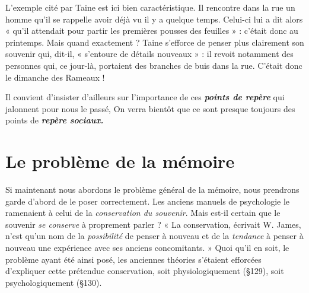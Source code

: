 \vspace{0.24cm}
{\footnotesize 
L’exemple cité par Taine est ici bien caractéristique. Il rencontre dans
la rue un homme qu’il se rappelle avoir déjà vu il y a quelque temps.
Celui-ci lui a dit alors « qu’il attendait pour partir les premières pousses
des feuilles » : c'était donc au printemps. Mais quand exactement ? Taine
s'efforce de penser plus clairement son souvenir qui, dit-il, « s’entoure de
détails nouveaux » : il revoit notamment des personnes qui, ce jour-là,
portaient des branches de buis dans la rue. C'était donc le dimanche des
Rameaux !}
\vspace{0.31cm}

Il convient d’insister d’ailleurs sur l'importance de ces \textbf{\textit {points de
repère}} qui jalonnent pour nous le passé, On verra bientôt que ce sont
presque toujours des points de \textbf{\textit {repère sociaux.}}

\section{Le problème de la mémoire}%
Si maintenant nous abordons
le problème général de la mémoire, nous prendrons garde d’abord
de le poser correctement. Les anciens manuels de psychologie le
ramenaient à celui de la {\it conservation du souvenir}. Mais est-il certain
que le souvenir {\it se conserve} à proprement parler ? « La conservation,
écrivait W. James, n’est qu’un nom de la {\it possibilité} de penser à
nouveau et de la {\it tendance} à penser à nouveau une expérience avec ses
anciens concomitants. » Quoi qu’il en soit, le problème ayant été
ainsi posé, les anciennes théories s'étaient efforcées d'expliquer cette
prétendue conservation, soit physiologiquement (\S 129), soit psychologiquement (\S 130).

